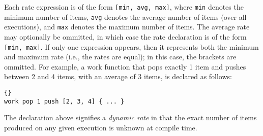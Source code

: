 \documentclass[11pt]{article}
\begin{document}
Each rate expression is of the form \lstinline|[min, avg, max]|, where
\lstinline|min| denotes the minimum number of items, \lstinline|avg|
denotes the average number of items (over all executions), and
\lstinline|max| denotes the maximum number of items.  The average rate
may optionally be ommitted, in which case the rate declaration is of
the form \lstinline|[min, max]|.  If only one expression appears, then
it represents both the minimum and maximum rate (i.e., the rates are
equal); in this case, the brackets are ommitted.  For example, a work
function that pops exactly 1 item and pushes between 2 and 4 items,
with an average of 3 items, is declared as follows:

\begin{lstlisting}{}
work pop 1 push [2, 3, 4] { ... }
\end{lstlisting}

The declaration above signifies a {\it dynamic rate} in that the exact
number of items produced on any given execution is unknown at compile
time.  
\end{document}
